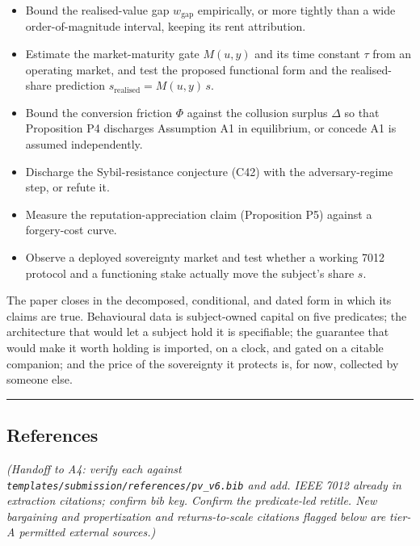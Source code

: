 \documentclass[
  11pt,
]{article}
\providecommand{\tightlist}{%
  \setlength{\itemsep}{0pt}\setlength{\parskip}{0pt}}
\begin{document}
\begin{itemize}
\tightlist
\item
  Bound the realised-value gap \(w_{\text{gap}}\) empirically, or more
  tightly than a wide order-of-magnitude interval, keeping its rent
  attribution.
\item
  Estimate the market-maturity gate \(M(u,y)\) and its time constant
  \(\tau\) from an operating market, and test the proposed functional
  form and the realised-share prediction
  \(s_{\text{realised}} = M(u,y)\, s\).
\item
  Bound the conversion friction \(\Phi\) against the collusion surplus
  \(\Delta\) so that Proposition P4 discharges Assumption A1 in
  equilibrium, or concede A1 is assumed independently.
\item
  Discharge the Sybil-resistance conjecture (C42) with the
  adversary-regime step, or refute it.
\item
  Measure the reputation-appreciation claim (Proposition P5) against a
  forgery-cost curve.
\item
  Observe a deployed sovereignty market and test whether a working 7012
  protocol and a functioning stake actually move the subject's share
  \(s\).
\end{itemize}

The paper closes in the decomposed, conditional, and dated form in which
its claims are true. Behavioural data is subject-owned capital on five
predicates; the architecture that would let a subject hold it is
specifiable; the guarantee that would make it worth holding is imported,
on a clock, and gated on a citable companion; and the price of the
sovereignty it protects is, for now, collected by someone else.

\begin{center}\rule{0.5\linewidth}{0.5pt}\end{center}

\subsection{References}\label{references}

\emph{(Handoff to A4: verify each against
\texttt{templates/submission/references/pv\_v6.bib} and add. IEEE 7012
already in extraction citations; confirm bib key. Confirm the
predicate-led retitle. New bargaining and propertization and
returns-to-scale citations flagged below are tier-A permitted external
sources.)}
\end{document}
